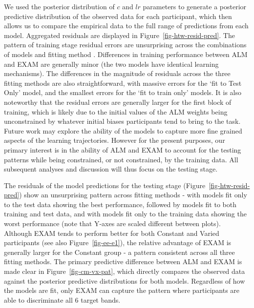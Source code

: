\documentclass[
  11pt,
  letterpaper,
]{article}
\begin{document}
We used the posterior distribution of \(c\) and \(lr\) parameters to
generate a posterior predictive distribution of the observed data for
each participant, which then allows us to compare the empirical data to
the full range of predictions from each model. Aggregated residuals are
displayed in Figure~\ref{fig-htw-resid-pred}. The pattern of training
stage residual errors are unsurprising across the combinations of models
and fitting method . Differences in training performance between ALM and
EXAM are generally minor (the two models have identical learning
mechanisms). The differences in the magnitude of residuals across the
three fitting methods are also straightforward, with massive errors for
the `fit to Test Only' model, and the smallest errors for the `fit to
train only' models. It is also noteworthy that the residual errors are
generally larger for the first block of training, which is likely due to
the initial values of the ALM weights being unconstrained by whatever
initial biases participants tend to bring to the task. Future work may
explore the ability of the models to capture more fine grained aspects
of the learning trajectories. However for the present purposes, our
primary interest is in the ability of ALM and EXAM to account for the
testing patterns while being constrained, or not constrained, by the
training data. All subsequent analyses and discussion will thus focus on
the testing stage.

The residuals of the model predictions for the testing stage
(Figure~\ref{fig-htw-resid-pred}) show an unsurprising pattern across
fitting methods - with models fit only to the test data showing the best
performance, followed by models fit to both training and test data, and
with models fit only to the training data showing the worst performance
(note that Y-axes are scaled different between plots). Although EXAM
tends to perform better for both Constant and Varied participants (see
also Figure~\ref{fig-ee-e1}), the relative advantage of EXAM is
generally larger for the Constant group - a pattern consistent across
all three fitting methods. The primary predictive difference between ALM
and EXAM is made clear in Figure~\ref{fig-cm-vx-pat}, which directly
compares the observed data against the posterior predictive
distributions for both models. Regardless of how the models are fit,
only EXAM can capture the pattern where participants are able to
discriminate all 6 target bands.
\end{document}
